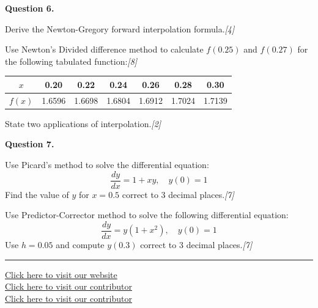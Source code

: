 \documentclass[11pt,a4paper]{article}
\newcommand{\pts}[1]{\hfill   \textit{[#1]}}
\begin{document}
\medskip


\noindent   \textbf{Question 6.}

\begin{parts}
  \item Derive the Newton-Gregory forward interpolation formula.\pts{4}
  \item Use Newton's Divided difference method to calculate $f(0.25)$ and $f(0.27)$ for the following tabulated function:\pts{8}
  
\begin{center}
  
\begin{tabular}{|c|c|c|c|c|c|c|}
    \hline
    $x$ & 0.20 & 0.22 & 0.24 & 0.26 & 0.28 & 0.30 \\
    \hline
    $f(x)$ & 1.6596 & 1.6698 & 1.6804 & 1.6912 & 1.7024 & 1.7139 \\
    \hline
  \end{tabular}
  \end{center}
  \item State two applications of interpolation.\pts{2}
\end{parts}

\medskip


\noindent   \textbf{Question 7.}

\begin{parts}
  \item Use Picard's method to solve the differential equation:
  \[ \frac{dy}{dx} = 1 + xy, \quad y(0) = 1 \]
  Find the value of $y$ for $x = 0.5$ correct to 3 decimal places.\pts{7}
  \item Use Predictor-Corrector method to solve the following differential equation:
  \[ \frac{dy}{dx} = y(1 + x^2), \quad y(0) = 1 \]
  Use $h = 0.05$ and compute $y(0.3)$ correct to 3 decimal places.\pts{7}
\end{parts}

\vfill
\rule{\linewidth}{0.4pt}

\begin{center}\small
\href{https://bhu-exam.vercel.app/}{Click here to visit our website}\\[4pt]\href{https://me-aryan.vercel.app/}{Click here to visit our contributor}\\[4pt]\href{https://quashan-me.vercel.app/}{Click here to visit our contributor}
\end{center}
\end{document}
